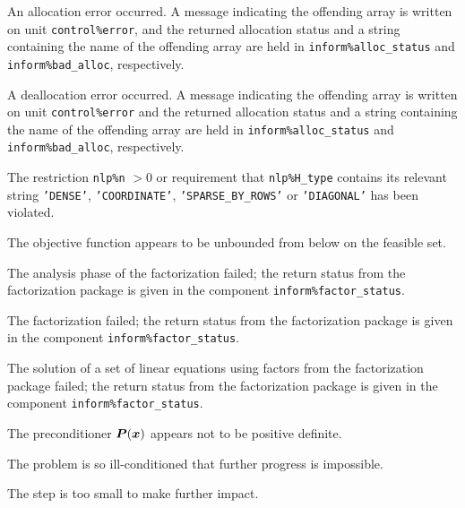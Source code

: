 \documentclass{galahad}
\begin{document}
\begin{description}

 An allocation error occurred.
A message indicating the offending
array is written on unit {\tt control\%error}, and the returned allocation
status and a string containing the name of the offending array
are held in {\tt inform\%alloc\_\-status}
and {\tt inform\%bad\_alloc}, respectively.

 A deallocation error occurred.
A message indicating the offending
array is written on unit {\tt control\%error} and the returned allocation
status and a string containing the name of the offending array
are held in {\tt inform\%alloc\_\-status}
and {\tt inform\%bad\_alloc}, respectively.

  The restriction {\tt nlp\%n} $> 0$
  or requirement that {\tt nlp\%H\_type} contains its relevant string
  {\tt 'DENSE'}, {\tt 'COORDINATE'}, {\tt 'SPARSE\_BY\_ROWS'}
  or {\tt 'DIAGONAL'}
  has been violated.


  The objective function appears to be unbounded
 from below on the feasible set.

 The analysis phase of the factorization failed;
 the return status from the factorization
    package is given in the component {\tt inform\%fac\-t\-or\_status}.

 The factorization failed;
 the return status from the factorization
    package is given in the component {\tt inform\%fac\-t\-or\_status}.

 The solution of a set of linear equations
 using factors from the factorization package failed;
 the return status from the factorization
    package is given in the component {\tt inform\%fac\-t\-or\_status}.

 The preconditioner ${\bm{P}}({\bm{x}})$ appears not to
  be positive definite.

 The problem is so ill-conditioned that
  further progress is impossible.

 The step is too small to make further impact.


\end{description}
\end{document}
